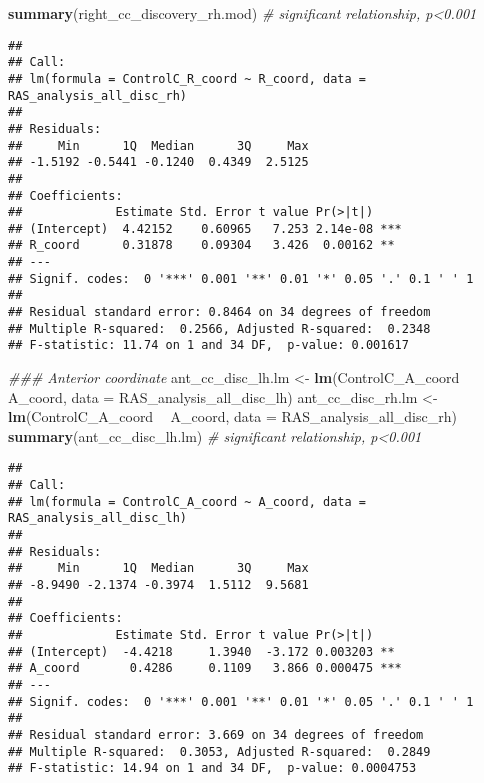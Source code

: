 \documentclass[
]{article}
\newenvironment{Shaded}{\begin{snugshade}}{\end{snugshade}}
\newcommand{\CommentTok}[1]{\textcolor[rgb]{0.56,0.35,0.01}{\textit{#1}}}
\newcommand{\DataTypeTok}[1]{\textcolor[rgb]{0.13,0.29,0.53}{#1}}
\newcommand{\KeywordTok}[1]{\textcolor[rgb]{0.13,0.29,0.53}{\textbf{#1}}}
\newcommand{\NormalTok}[1]{#1}
\newcommand{\OperatorTok}[1]{\textcolor[rgb]{0.81,0.36,0.00}{\textbf{#1}}}
\newcommand{\StringTok}[1]{\textcolor[rgb]{0.31,0.60,0.02}{#1}}
\begin{document}
\begin{Shaded}
\begin{Highlighting}[]
\KeywordTok{summary}\NormalTok{(right_cc_discovery_rh.mod) }\CommentTok{# significant relationship, p<0.001}
\end{Highlighting}
\end{Shaded}

\begin{verbatim}
## 
## Call:
## lm(formula = ControlC_R_coord ~ R_coord, data = RAS_analysis_all_disc_rh)
## 
## Residuals:
##     Min      1Q  Median      3Q     Max 
## -1.5192 -0.5441 -0.1240  0.4349  2.5125 
## 
## Coefficients:
##             Estimate Std. Error t value Pr(>|t|)    
## (Intercept)  4.42152    0.60965   7.253 2.14e-08 ***
## R_coord      0.31878    0.09304   3.426  0.00162 ** 
## ---
## Signif. codes:  0 '***' 0.001 '**' 0.01 '*' 0.05 '.' 0.1 ' ' 1
## 
## Residual standard error: 0.8464 on 34 degrees of freedom
## Multiple R-squared:  0.2566, Adjusted R-squared:  0.2348 
## F-statistic: 11.74 on 1 and 34 DF,  p-value: 0.001617
\end{verbatim}

\begin{Shaded}
\begin{Highlighting}[]
\CommentTok{### Anterior coordinate}
\NormalTok{ant_cc_disc_lh.lm <-}\StringTok{ }\KeywordTok{lm}\NormalTok{(ControlC_A_coord }\OperatorTok{~}\StringTok{ }\NormalTok{A_coord, }\DataTypeTok{data =}\NormalTok{ RAS_analysis_all_disc_lh)}
\NormalTok{ant_cc_disc_rh.lm <-}\StringTok{ }\KeywordTok{lm}\NormalTok{(ControlC_A_coord }\OperatorTok{~}\StringTok{ }\NormalTok{A_coord, }\DataTypeTok{data =}\NormalTok{ RAS_analysis_all_disc_rh)}
\KeywordTok{summary}\NormalTok{(ant_cc_disc_lh.lm) }\CommentTok{# significant relationship, p<0.001}
\end{Highlighting}
\end{Shaded}

\begin{verbatim}
## 
## Call:
## lm(formula = ControlC_A_coord ~ A_coord, data = RAS_analysis_all_disc_lh)
## 
## Residuals:
##     Min      1Q  Median      3Q     Max 
## -8.9490 -2.1374 -0.3974  1.5112  9.5681 
## 
## Coefficients:
##             Estimate Std. Error t value Pr(>|t|)    
## (Intercept)  -4.4218     1.3940  -3.172 0.003203 ** 
## A_coord       0.4286     0.1109   3.866 0.000475 ***
## ---
## Signif. codes:  0 '***' 0.001 '**' 0.01 '*' 0.05 '.' 0.1 ' ' 1
## 
## Residual standard error: 3.669 on 34 degrees of freedom
## Multiple R-squared:  0.3053, Adjusted R-squared:  0.2849 
## F-statistic: 14.94 on 1 and 34 DF,  p-value: 0.0004753
\end{verbatim}
\end{document}
